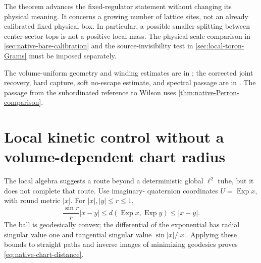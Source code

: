 \documentclass[11pt,oneside,openany]{book}
\theoremstyle{definition}
\theoremstyle{remark}
\newcommand{\src}[2]{\cite[#2]{#1}}
\newcommand{\sourcebasis}[1]{\par\smallskip\noindent #1\par}
\begin{document}
The theorem advances the fixed-regulator statement without changing its
physical meaning. It concerns a growing number of lattice sites, not
an already calibrated fixed physical box. In particular, a possible
smaller splitting between center-sector tops is not a positive local
mass. The physical scale comparison in
\cref{sec:native-bare-calibration} and the source-invisibility test in
\cref{sec:local-toron-Grams} must be imposed separately.
\sourcebasis{The volume-uniform geometry and winding estimates are
in \src{F16B}{V49--V50}; the corrected joint recovery, hard capture,
soft no-escape estimate, and spectral passage are in
\src{F16B}{V54}. The passage from the subordinated reference to Wilson
uses \cref{thm:native-Perron-comparison}.}


\section{Local kinetic control without a volume-dependent chart radius}
\label{sec:native-supnorm}
The local algebra suggests a route beyond a deterministic global
$\ell^2$ tube, but it does not complete that route. Use imaginary-
quaternion coordinates $U=\operatorname{Exp}x$, with round metric
$|x|$. For $|x|,|y|\le r\le1$,
\begin{equation}
 \frac{\sin r}{r}|x-y|
 \le d(\operatorname{Exp}x,\operatorname{Exp}y)\le|x-y|.
 \label{eq:native-chart-distance}
\end{equation}
The ball is geodesically convex; the differential of the exponential
has radial singular value one and tangential singular value
$\sin|x|/|x|$. Applying these bounds to straight paths and inverse
images of minimizing geodesics proves
\cref{eq:native-chart-distance}.
\end{document}
